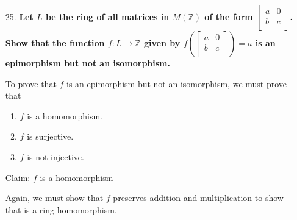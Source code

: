 \documentclass{article}
\begin{document}
\begin{enumerate}
		\item [25.] \textbf{Let $L$ be the ring of all matrices in $M(\mathbb{Z})$ of the form 
							$\begin{bmatrix}
								a & 0 \\
								b & c \\
							\end{bmatrix}$.
							Show that the function $f:L \rightarrow \mathbb{Z}$ given by $f\left({
							\begin{bmatrix}
								a & 0 \\
								b & c \\
							\end{bmatrix}}\right) = a$ is an epimorphism but not an isomorphism.}

			To prove that $f$ is an epimorphism but not an isomorphism, we must prove that 
			\begin{enumerate}
				\item $f$ is a homomorphism.
				\item $f$ is surjective.
				\item $f$ is not injective.
			\end{enumerate}

			\underline{Claim: $f$ is a homomorphism}

			Again, we must show that $f$ preserves addition and multiplication to show that is a 
			ring homomorphism.


\end{enumerate}
\end{document}
